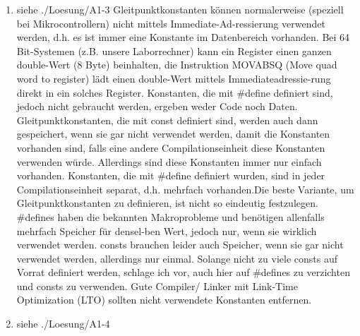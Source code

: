 \begin{enumerate}

\noindent\makebox[\linewidth]{\rule{\paperwidth}{0.4pt}}

\noindent\makebox[\linewidth]{\rule{\paperwidth}{0.4pt}}

\noindent\makebox[\linewidth]{\rule{\paperwidth}{0.4pt}}

\noindent\makebox[\linewidth]{\rule{\paperwidth}{0.4pt}}

\noindent\makebox[\linewidth]{\rule{\paperwidth}{0.4pt}}
  \item siehe ./Loesung/A1-3
Gleitpunktkonstanten können normalerweise (speziell bei Mikrocontrollern) nicht mittels Immediate-Ad-ressierung verwendet werden, d.h. es ist immer eine Konstante im Datenbereich vorhanden. Bei 64 Bit-Systemen (z.B. unsere Laborrechner) kann ein Register einen ganzen double-Wert (8 Byte) beinhalten, die Instruktion MOVABSQ (Move quad word to register) lädt einen double-Wert mittels Immediateadressie-rung direkt in ein solches Register. Konstanten, die mit \#define definiert sind, jedoch nicht gebraucht werden, ergeben weder Code noch Daten. Gleitpunktkonstanten, die mit const definiert sind, werden auch dann gespeichert, wenn sie gar nicht verwendet werden, damit die Konstanten vorhanden sind, falls eine andere Compilationseinheit diese Konstanten verwenden würde. Allerdings sind diese Konstanten immer nur einfach vorhanden. Konstanten, die mit \#define definiert wurden, sind in jeder Compilationseinheit separat, d.h. mehrfach vorhanden.Die beste Variante, um Gleitpunktkonstanten zu definieren, ist nicht so eindeutig festzulegen. \#defines haben die bekannten Makroprobleme und benötigen allenfalls mehrfach Speicher für densel-ben Wert, jedoch nur, wenn sie wirklich verwendet werden. consts brauchen leider auch Speicher, wenn sie gar nicht verwendet werden, allerdings nur einmal. Solange nicht zu viele consts auf Vorrat definiert werden, schlage ich vor, auch hier auf \#defines zu verzichten und consts zu verwenden. Gute Compiler/ Linker mit Link-Time Optimization (LTO) sollten nicht verwendete Konstanten entfernen.
  \item siehe ./Loesung/A1-4
  
  \noindent\makebox[\linewidth]{\rule{\paperwidth}{0.4pt}}
  
  \noindent\makebox[\linewidth]{\rule{\paperwidth}{0.4pt}}
  
  \noindent\makebox[\linewidth]{\rule{\paperwidth}{0.4pt}}
  
  \noindent\makebox[\linewidth]{\rule{\paperwidth}{0.4pt}}
  
  \noindent\makebox[\linewidth]{\rule{\paperwidth}{0.4pt}}
\end{enumerate}

